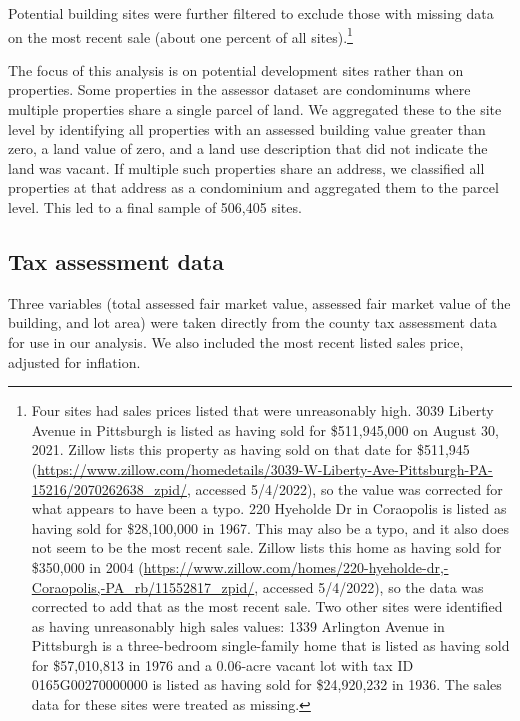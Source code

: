 \documentclass[
]{book}
\begin{document}
Potential building sites were further filtered to exclude those with missing data
on the most recent sale (about one percent of all sites).\footnote{Four sites had sales
  prices listed that were unreasonably high. 3039 Liberty Avenue in Pittsburgh is
  listed as having sold for \$511,945,000 on August 30, 2021. Zillow lists this
  property as having sold on that date for \$511,945
  (\url{https://www.zillow.com/homedetails/3039-W-Liberty-Ave-Pittsburgh-PA-15216/2070262638_zpid/}, accessed 5/4/2022),
  so the value was corrected for what appears to have been a typo. 220 Hyeholde Dr
  in Coraopolis is listed as having sold for \$28,100,000 in 1967. This may also
  be a typo, and it also does not seem to be the most recent sale. Zillow lists
  this home as having sold for \$350,000 in 2004
  (\url{https://www.zillow.com/homes/220-hyeholde-dr,-Coraopolis,-PA_rb/11552817_zpid/},
  accessed 5/4/2022), so the data was corrected to add that as the most recent sale.
  Two other sites were identified as having unreasonably high sales values: 1339
  Arlington Avenue in Pittsburgh is a three-bedroom single-family home that is
  listed as having sold for \$57,010,813 in 1976 and a 0.06-acre vacant lot with
  tax ID 0165G00270000000 is listed as having sold for \$24,920,232 in 1936. The
  sales data for these sites were treated as missing.}

The focus of this analysis is on potential development sites rather than on
properties. Some properties in the assessor dataset are condominums where
multiple properties share a single parcel of land. We aggregated these to the
site level by identifying all properties with an assessed building value
greater than zero, a land value of zero, and a land use description that did
not indicate the land was vacant. If multiple such properties share an address,
we classified all properties at that address as a condominium and aggregated
them to the parcel level. This led to a final sample of 506,405 sites.

\hypertarget{tax-assessment-data}{%
\subsection{Tax assessment data}\label{tax-assessment-data}}

Three variables (total assessed fair market value, assessed fair market
value of the building, and lot area) were taken directly from the county
tax assessment data for use in our analysis. We also included the most
recent listed sales price, adjusted for inflation.
\end{document}
